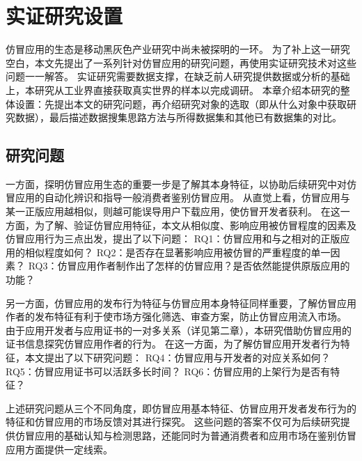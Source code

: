 \chapter{实证研究设置}
\label{chp:research_settings}

仿冒应用的生态是移动黑灰色产业研究中尚未被探明的一环。
为了补上这一研究空白，本文先提出了一系列针对仿冒应用的研究问题，再使用实证研究技术对这些问题一一解答。
实证研究需要数据支撑，在缺乏前人研究提供数据或分析的基础上，本研究从工业界直接获取真实世界的样本以完成调研。
本章介绍本研究的整体设置：先提出本文的研究问题，再介绍研究对象的选取（即从什么对象中获取研究数据），最后描述数据搜集思路方法与所得数据集和其他已有数据集的对比。


\section{研究问题}

一方面，探明仿冒应用生态的重要一步是了解其本身特征，以协助后续研究中对仿冒应用的自动化辨识和指导一般消费者鉴别仿冒应用。
从直觉上看，仿冒应用与某一正版应用越相似，则越可能误导用户下载应用，使仿冒开发者获利。
在这一方面，为了解、验证仿冒应用特征，本文从相似度、影响应用被仿冒程度的因素及仿冒应用行为三点出发，提出了以下问题：
RQ1：仿冒应用和与之相对的正版应用的相似程度如何？
RQ2：是否存在显著影响应用被仿冒的严重程度的单一因素？
RQ3：仿冒应用作者制作出了怎样的仿冒应用？是否依然能提供原版应用的功能？

另一方面，仿冒应用的发布行为特征与仿冒应用本身特征同样重要，了解仿冒应用作者的发布特征有利于使市场方强化筛选、审查方案，防止仿冒应用流入市场。
由于应用开发者与应用证书的一对多关系（详见第二章），本研究借助仿冒应用的证书信息探究仿冒应用作者的行为。
在这一方面，为了解仿冒应用开发者行为特征，本文提出了以下研究问题：
RQ4：仿冒应用与开发者的对应关系如何？
RQ5：仿冒应用证书可以活跃多长时间？
RQ6：仿冒应用的上架行为是否有特征？


上述研究问题从三个不同角度，即仿冒应用基本特征、仿冒应用开发者发布行为的特征和仿冒应用的市场反馈对其进行探究。
这些问题的答案不仅可为后续研究提供仿冒应用的基础认知与检测思路，还能同时为普通消费者和应用市场在鉴别仿冒应用方面提供一定线索。

